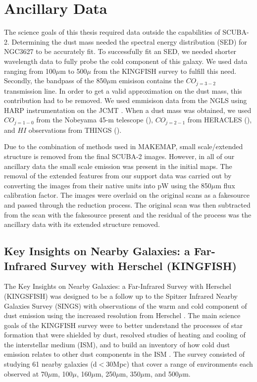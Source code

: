 \section{Ancillary Data}

The science goals of this thesis required data outside the capabilities of SCUBA-2.  Determining the dust mass needed the spectral energy distribution (SED) for NGC3627 to be accurately fit.  To successfully fit an SED, we needed shorter wavelength data to fully probe the cold component of this galaxy. We used data ranging from 100$\mu$m to 500$\mu$ from the KINGFISH survey \citet{kennicutt2011} to fulfill this need.  Secondly, the bandpass of the 850$\mu$m emisison contains the $CO_{j=3-2}$ transmission line.  In order to get a valid approximation on the dust mass, this contribution had to be removed.  We used emmisison data from the NGLS using HARP instrumentation on the JCMT \citet{wilson2012}.  When a dust mass was obtained, we used $CO_{j=1-0}$ from the Nobeyama 45-m telescope (\citet{kuno2007}), $CO_{j=2-1}$ from HERACLES (\citet{leroy2009}), and $HI$ observations from THINGS (\citet{walter2008}).

Due to the combination of methods used in MAKEMAP, small scale/extended structure is removed from the final SCUBA-2 images.  However, in all of our ancillary data the small scale emission was present in the initial maps.  The removal of the extended features from our support data was carried out by converting the images from their native units into pW using the 850$\mu$m flux calibration factor.  The images were overlaid on the original scans as a fakesource and passed through the reduction process.  The original scan was then subtracted from the scan with the fakesource present and the residual of the process was the ancillary data with its extended structure removed.%

\subsection{Key Insights on Nearby Galaxies: a Far-Infrared Survey with Herschel (KINGFISH)}

The Key Insights on Nearby Galaxies: a Far-Infrared Survey with Herschel (KINGSFISH) was designed to be a follow up to the Spitzer Infrared Nearby Galaxies Survey (SINGS) with observations of the warm and cold component of dust emission using the increased resolution from Herschel \citet{kennicutt2011}.  The main science goals of the KINGFISH survey were to better understand the processes of star formation that were shielded by dust, resolved studies of heating and cooling of the interstellar medium (ISM), and to build an inventory of how cold dust emission relates to other dust components in the ISM \citet{kennicutt2011}.  The survey consisted of studying 61 nearby galaxies (d$<$30Mpc) that cover a range of environments each observed at 70$\mu$m, 100$\mu$, 160$\mu$m, 250$\mu$m, 350$\mu$m, and 500$\mu$m.  


